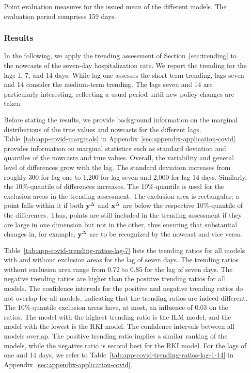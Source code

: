 \begin{table}[]
    \centering
    
    \caption{Point evaluation measures for the issued mean of the different models. The evaluation period comprises 159 days. }
    \label{tab:app-covid-rmse}
\end{table}

\subsubsection*{Results}

In the following, we apply the trending assessment of Section~\ref{sec:trending} to the nowcasts of the seven-day hospitalization rate.
We report the trending for the lags 1, 7, and 14 days.
While lag one assesses the short-term trending, lags seven and 14 consider the medium-term trending.
The lags seven and 14 are particularly interesting, reflecting a usual period until new policy changes are taken.

Before stating the results, we provide background information on the marginal distributions of the true values and nowcasts for the different lags.
Table~\ref{tab:app-covid-marginals} in Appendix~\ref{sec:appendix-application-covid} provides information on marginal statistics such as standard deviation and quantiles of the nowcasts and true values.
Overall, the variability and general level of differences grow with the lag.
The standard deviation increases from roughly 300 for lag one to 1,200 for lag seven and 2,000 for lag 14 days.
Similarly, the 10\%-quantile of differences increases.
The 10\%-quantile is used for the exclusion areas in the trending assessment.
The exclusion area is rectangular; a point falls within it if both $\mathbf{y}^{\Delta}$ and $\mathbf{x}^{\Delta}$ are below the respective 10\%-quantile of the differences.
Thus, points are still included in the trending assessment if they are large in one dimension but not in the other, thus ensuring that substantial changes in, for example, $\mathbf{y}^{\Delta}$ are to be recognized by the nowcast and vice versa.

Table~\ref{tab:app-covid-trending-ratios-lag-7} lists the trending ratios for all models with and without exclusion areas for the lag of seven days.
The trending ratios without exclusion area range from 0.72 to 0.85 for the lag of seven days.
The negative trending ratios are higher than the positive trending ratios for all models.
The confidence intervals for the positive and negative trending ratios do not overlap for all models, indicating that the trending ratios are indeed different.
The 10\%-quantile exclusion areas have, at most, an influence of 0.03 on the ratios.
The model with the highest trending ratio is the ILM model, and the model with the lowest is the RKI model.
The confidence intervals between all models overlap.
The positive trending ratio implies a similar ranking of the models, while the negative ratio is second best for the RKI model.
For the lags of one and 14 days, we refer to Table~\ref{tab:app-covid-trending-ratios-lag-1-14} in Appendix~\ref{sec:appendix-application-covid}.

